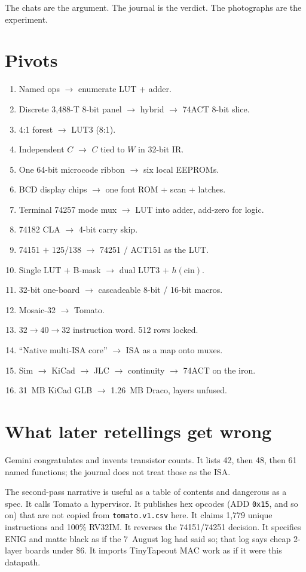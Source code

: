 \documentclass[11pt,openany]{book}
\begin{document}
The chats are the argument. The journal is the verdict. The photographs are the experiment.

\chapter{Pivots}

\begin{enumerate}[leftmargin=1.4em]
\item Named ops $\to$ enumerate LUT + adder.
\item Discrete 3{,}488-T 8-bit panel $\to$ hybrid $\to$ 74ACT 8-bit slice.
\item 4:1 forest $\to$ LUT3 (8:1).
\item Independent $C$ $\to$ $C$ tied to $W$ in 32-bit IR.
\item One 64-bit microcode ribbon $\to$ six local EEPROMs.
\item BCD display chips $\to$ one font ROM + scan + latches.
\item Terminal 74257 mode mux $\to$ LUT into adder, add-zero for logic.
\item 74182 CLA $\to$ 4-bit carry skip.
\item 74151 $+$ 125/138 $\to$ 74251 / ACT151 as the LUT.
\item Single LUT $+$ B-mask $\to$ dual LUT3 $+$ $h(\mathrm{cin})$.
\item 32-bit one-board $\to$ cascadeable 8-bit / 16-bit macros.
\item Mosaic-32 $\to$ Tomato.
\item $32 \to 40 \to 32$ instruction word. 512 rows locked.
\item ``Native multi-ISA core'' $\to$ ISA as a map onto muxes.
\item Sim $\to$ KiCad $\to$ JLC $\to$ continuity $\to$ 74ACT on the iron.
\item 31~MB KiCad GLB $\to$ 1.26~MB Draco, layers unfused.
\end{enumerate}

\chapter{What later retellings get wrong}

Gemini congratulates and invents transistor counts. It lists 42, then 48, then 61 named functions; the journal does not treat those as the ISA.

The second-pass narrative is useful as a table of contents and dangerous as a spec. It calls Tomato a hypervisor. It publishes hex opcodes (ADD \texttt{0x15}, and so on) that are not copied from \texttt{tomato.v1.csv} here. It claims 1{,}779 unique instructions and 100\% RV32IM. It reverses the 74151/74251 decision. It specifies ENIG and matte black as if the 7~August log had said so; that log says cheap 2-layer boards under \$6. It imports TinyTapeout MAC work as if it were this datapath.
\end{document}
